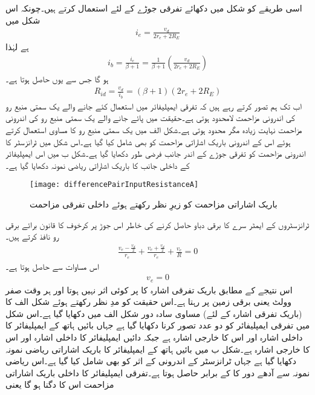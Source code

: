 اسی طریقے کو شکل   میں دکھائے تفرقی جوڑے کے لئے استعمال کرتے ہیں۔چونکہ اس شکل میں
\begin{align}
i_e=\frac{v_d}{2 r_e+2 R_E}
\end{align}
ہے لہٰذا
\begin{align}
i_b=\frac{i_e}{\beta+1}=\frac{1}{\beta+1} \left(\frac{v_d}{2 r_e +2 R_E} \right )
\end{align}
ہو گا جس سے  یوں حاصل ہوتا ہے۔
\begin{align}
R_{id}=\frac{v_d}{i_b}=\left(\beta+1 \right ) \left(2 r_e+2 R_E \right )
\end{align}
اب تک ہم تصور کرتے رہے ہیں کہ تفرقی ایمپلیفائر میں استعمال کئے جانے والے یک سمتی  منبع رو کی اندرونی مزاحمت لامحدود ہوتی ہے۔حقیقت میں پائے جانے والے یک سمتی  منبع رو کی اندرونی مزاحمت نہایت زیادہ مگر محدود ہوتی ہے۔شکل  الف میں یک سمتی  منبع رو کا مساوی  استعمال کرتے ہوئے اس کے اندرونی باریک اشاراتی مزاحمت   کو بھی شامل کیا گیا ہے۔اس شکل میں ٹرانزسٹر کا اندرونی مزاحمت   کو تفرقی جوڑے کے اندر جانب فرضی طور دکھایا گیا ہے۔شکل  ب میں اس ایمپلیفائر کے داخلی جانب کا باریک اشاراتی ریاضی نمونہ دکھایا گیا ہے۔
\begin{figure}
\centering
\texttt{[image: differencePairInputResistanceA]}
\caption{باریک اشاراتی مزاحمت کو زیرِ نظر رکھتے ہوئے داخلی تفرقی مزاحمت}
\label{شکل_باریک_اشاراتی_مزاحمت_کو_زیر_نظر}
\end{figure}
ٹرانزسٹروں کے ایمٹر سرے کا برقی دباو  حاصل کرنے کی خاطر اس جوڑ پر کرخوف کا قانون برائے برقی رو نافذ کرتے ہیں۔
\begin{align}
\frac{v_e - \frac{v_d}{2}}{r_e} + \frac{v_e + \frac{v_d}{2}}{r_e} +\frac{v_e}{R}=0
\end{align}
اس مساوات سے حاصل ہوتا ہے۔
\begin{align}\label{مساوات_تفرقی_جوڑا_تفرقی_اشارے_کے_لئے_جوڑے_کی_مخارج_برقی_زمین_ہے}
v_e=0
\end{align}
اس نتیجے کے مطابق باریک تفرقی اشارہ   کا  پر کوئی اثر نہیں ہوتا اور    ہر وقت صفر وولٹ یعنی برقی زمین پر رہتا ہے۔اس حقیقت کو مدِ نظر رکھتے ہوئے شکل  الف  کا (باریک تفرقی اشارہ کے لئے) مساوی سادہ دور شکل  الف میں دکھایا گیا ہے۔اس شکل میں تفرقی ایمپلیفائر کو دو عدد   تصور کرنا دکھایا گیا ہے جہاں بائیں ہاتھ کے ایمپلیفائر کا داخلی اشارہ  اور اس کا خارجی اشارہ  ہے جبکہ دائیں ایمپلیفائر کا داخلی اشارہ  اور اس کا خارجی اشارہ  ہے۔شکل  ب میں بائیں ہاتھ کے ایمپلیفائر کا باریک اشاراتی ریاضی نمونہ دکھایا گیا ہے جہاں ٹرانزسٹر کے اندرونی   کے اثر کو بھی شامل کیا گیا ہے۔اس  ریاضی نمونہ سے آدھے دور کا    کے برابر حاصل ہوتا ہے۔تفرقی ایمپلیفائر کا داخلی باریک اشاراتی مزاحمت اس کا دگنا ہو گا یعنی
